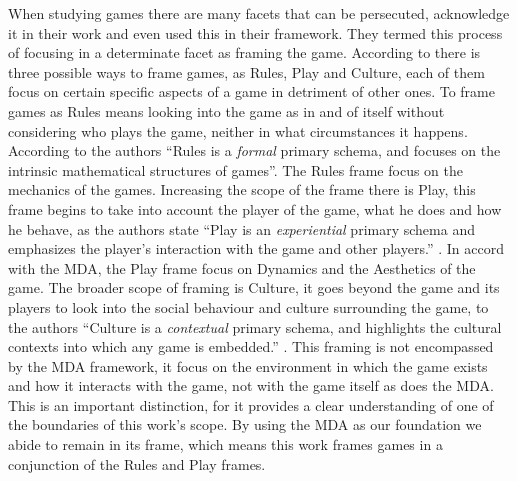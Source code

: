 When studying games there are many facets that can be persecuted, \cite{salen2004rules} acknowledge it in their work and even used this in their framework. They termed this process of focusing in a determinate facet as framing the game. According to \cite{salen2004rules} there is three possible ways to frame games, as Rules, Play and Culture, each of them focus on certain specific aspects of a game in detriment of other ones. To frame games as Rules means looking into the game as in and of itself without considering who plays the game, neither in what circumstances it happens. According to the authors ``Rules is a \textit{formal} primary schema, and focuses on the intrinsic mathematical structures of games''\citep{salen2004rules}. The Rules frame focus on the mechanics of the games. Increasing the scope of the frame there is Play, this frame begins to take into account the player of the game, what he does and how he behave, as the authors state ``Play is an \textit{experiential} primary schema and emphasizes the player's interaction with the game and other players.'' \cite{salen2004rules}. In accord with the MDA, the Play frame focus on Dynamics and the Aesthetics of the game. The broader scope of framing is Culture, it goes beyond the game and its players to look into the social behaviour and culture surrounding the game, to the authors ``Culture is a \textit{contextual} primary schema, and highlights the cultural contexts into which any game is embedded.'' \cite{salen2004rules}. This framing is not encompassed by the MDA framework, it focus on the environment in which the game exists and how it interacts with the game, not with the game itself as does the MDA. This is an important distinction, for it provides a clear understanding of one of the boundaries of this work's scope. By using the MDA as our foundation we abide to remain in its frame, which means this work frames games in a conjunction of the Rules and Play frames.

